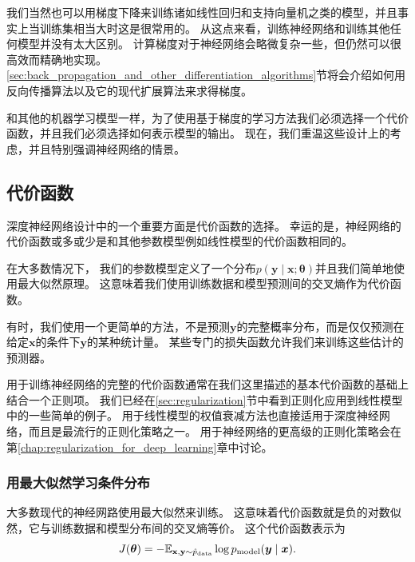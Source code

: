 
我们当然也可以用梯度下降来训练诸如线性回归和支持向量机之类的模型，并且事实上当训练集相当大时这是很常用的。
从这点来看，训练神经网络和训练其他任何模型并没有太大区别。
计算梯度对于神经网络会略微复杂一些，但仍然可以很高效而精确地实现。
\ref{sec:back_propagation_and_other_differentiation_algorithms}节将会介绍如何用反向传播算法以及它的现代扩展算法来求得梯度。

和其他的机器学习模型一样，为了使用基于梯度的学习方法我们必须选择一个代价函数，并且我们必须选择如何表示模型的输出。
现在，我们重温这些设计上的考虑，并且特别强调神经网络的情景。

\subsection{代价函数}
\label{sec:cost_functions}

深度神经网络设计中的一个重要方面是代价函数的选择。
幸运的是，神经网络的代价函数或多或少是和其他参数模型例如线性模型的代价函数相同的。

在大多数情况下， 我们的参数模型定义了一个分布$p(\bm{y}\mid\bm{x};\bm{\theta})$并且我们简单地使用最大似然原理。
这意味着我们使用训练数据和模型预测间的交叉熵作为代价函数。

有时，我们使用一个更简单的方法，不是预测$\bm{y}$的完整概率分布，而是仅仅预测在给定$\bm{x}$的条件下$\bm{y}$的某种统计量。
某些专门的损失函数允许我们来训练这些估计的预测器。

用于训练神经网络的完整的代价函数通常在我们这里描述的基本代价函数的基础上结合一个正则项。
我们已经在\ref{sec:regularization}节中看到正则化应用到线性模型中的一些简单的例子。
用于线性模型的权值衰减方法也直接适用于深度神经网络，而且是最流行的正则化策略之一。
用于神经网络的更高级的正则化策略会在第\ref{chap:regularization_for_deep_learning}章中讨论。


\subsubsection{用最大似然学习条件分布}
\label{sec:learning_conditional_distributions_with_maximum_likelihood}

大多数现代的神经网路使用最大似然来训练。
这意味着代价函数就是负的对数似然，它与训练数据和模型分布间的交叉熵等价。
这个代价函数表示为
\begin{equation}
J(\bm{\theta}) = -\mathbb{E}_{\mathbf{x}, \mathbf{y} \sim \hat{p}_\text{data}} \log p_\text{model} (\bm{y} \mid \bm{x}).
\end{equation}

